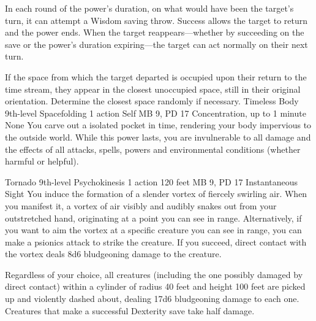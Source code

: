 In each round of the power's duration, on what would have
been the target's turn, it can attempt a Wisdom saving throw.
Success allows the target to return and the power ends. When
the target reappears---whether by succeeding on the save or
the power's duration expiring---the target can act normally
on their next turn.

If the space from which the target departed is occupied upon
their return to the time stream, they appear in the closest
unoccupied space, still in their original orientation. Determine
the closest space randomly if necessary.
\DndPowerHeader%
    {Timeless Body\label{pwr:timeless_body}}
    {9th-level Spacefolding}
    {1 action}
    {Self}
    {MB 9, PD 17}
    {Concentration, up to 1 minute}
    {None}
You carve out a isolated pocket in time,
rendering your body impervious to the outside world. While
this power lasts, you are invulnerable to all damage and the
effects of all attacks, spells, powers and environmental conditions
(whether harmful or helpful).

\DndPowerHeader%
    {Tornado\label{pwr:tornado}}
    {9th-level Psychokinesis}
    {1 action}
    {120 feet}
    {MB 9, PD 17}
    {Instantaneous}
    {Sight}
You induce the formation of a slender vortex
of fiercely swirling air. When you manifest it, a vortex of
air visibly and audibly snakes out from your outstretched
hand, originating at a point you can see in range.
Alternatively,
if you want to aim the vortex at a specific creature you can
see in range, you can make a psionics attack to strike the
creature. If you succeed, direct contact with the vortex deals
8d6 bludgeoning damage to the creature.

Regardless of your choice,
all creatures (including the one possibly damaged
by direct contact) within a cylinder of radius
40 feet and height 100 feet are picked up and violently dashed
about, dealing 17d6 bludgeoning damage to each one. Creatures
that make a successful Dexterity save take half damage.

